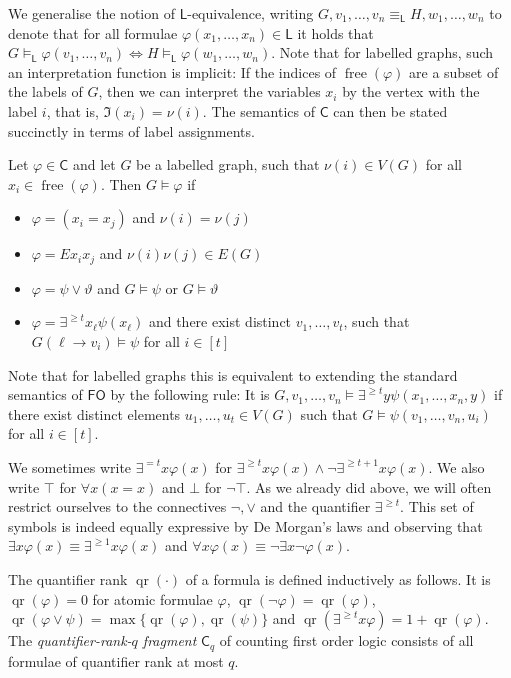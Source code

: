 \documentclass[a4paper,UKenglish,cleveref, autoref, thm-restate]{lipics-v2021}
\renewcommand{\phi}{\varphi}
\renewcommand{\theta}{\vartheta}
\newcommand{\I}{\ensuremath{\mathfrak I}}
\newcommand{\lFO}{\ensuremath{\mathsf{FO}}}
\newcommand{\lC} {\ensuremath{\mathsf C}}
\newcommand{\lL} {\ensuremath{\mathsf L}}
\DeclareMathOperator{\qr}{qr}
\DeclareMathOperator{\free}{free}
\begin{document}
We generalise the notion of $\lL$-equivalence, writing $G, v_1, \dots, v_n \equiv_\lL H, w_1, \dots, w_n$ to denote that for all formulae $\phi(x_1, \dots, x_n) \in \lL$ it holds that $G \models_\lL \phi(v_1, \dots, v_n) \Leftrightarrow H \models_\lL \phi(w_1, \dots, w_n)$. Note that for labelled graphs, such an interpretation function is implicit: If the indices of $\free(\phi)$ are a subset of the labels of $G$, then we can interpret the variables $x_i$ by the vertex with the label $i$, that is, $\I(x_i) = \nu(i)$. The semantics of $\lC$ can then be stated succinctly in terms of label assignments.

\begin{definition}[$\lC$ semantics of labelled graphs]
  Let $\phi \in \lC$ and let $G$ be a labelled graph, such that $\nu(i) \in V(G)$ for all $x_i \in \free(\phi)$. Then $G \models \phi$ if
  \begin{itemize}
  \item $\phi = (x_i = x_j)$ and $\nu(i) = \nu(j)$
  \item $\phi = Ex_ix_j$ and $\nu(i)\nu(j) \in E(G)$
  \item $\phi = \psi \lor \theta$ and $G \models \psi$ or $G \models \theta$
  \item $\phi = \exists^{\geq t} x_\ell \psi(x_\ell)$ and there exist distinct $v_1, \dots, v_t$, such that $G(\ell \to v_i) \models \psi$ for all $i \in [t]$
  \end{itemize}
\end{definition}

Note that for labelled graphs this is equivalent to extending the standard semantics of $\lFO$ by the following rule: It is $G, v_1, \dots, v_n \models \exists^{\geq t}y \psi(x_1, \dots, x_n, y)$ if there exist distinct elements $u_1, \dots, u_t \in V(G)$ such that $G \models \psi(v_1, \dots, v_n, u_i)$ for all $i \in [t]$.

We sometimes write $\exists^{=t}x \phi(x)$ for $\exists^{\geq t} x \phi(x) \land \neg\exists^{\geq t+1}x \phi(x)$. We also write $\top$ for $\forall x (x=x)$ and $\bot$ for $\neg \top$.
As we already did above, we will often restrict ourselves to the connectives $\neg, \lor$ and the quantifier $\exists^{\geq t}$. This set of symbols is indeed equally expressive by De Morgan's laws and observing that $\exists x \phi(x) \equiv \exists^{\geq 1}x \phi(x)$ and $\forall x \phi(x) \equiv \neg\exists x \neg\phi(x)$.

The quantifier rank $\qr(\cdot)$ of a formula is defined inductively as follows. It is $\qr(\phi) = 0$ for atomic formulae $\phi$, $\qr(\neg\phi) = \qr(\phi)$, $\qr(\phi \lor \psi) = \max \{ \qr(\phi), \qr(\psi)\}$ and $\qr(\exists^{\geq t}x \phi) = 1 + \qr(\phi)$. The \emph{quantifier-rank-$q$ fragment} $\lC_q$ of counting first order logic consists of all formulae of quantifier rank at most $q$.
\end{document}
